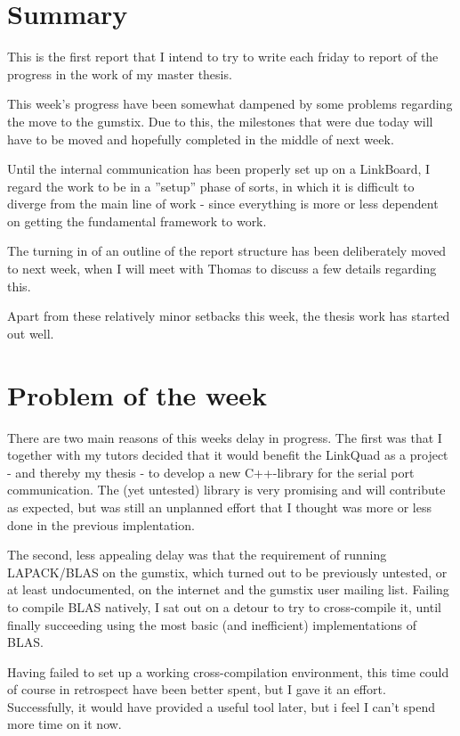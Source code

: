 \section{Summary}
This is the first report that I intend to try to write each friday to report
of the progress in the work of my master thesis.

This week's progress have been somewhat dampened by some problems regarding
the move to the gumstix. Due to this, the milestones that were due today
will have to be moved and hopefully completed in the middle of next week.

Until the internal communication has been properly set up on a LinkBoard,
I regard the work to be in a ''setup'' phase of sorts, in which it is
difficult to diverge from the main line of work - since everything is more
or less dependent on getting the fundamental framework to work.

The turning in of an outline of the report structure has been deliberately
moved to next week, when I will meet with Thomas to discuss a few details
regarding this.

Apart from these relatively minor setbacks this week, the thesis work
has started out well.

\section{Problem of the week}
There are two main reasons of this weeks delay in progress.
The first was that I together with my tutors decided that it would benefit
the LinkQuad as a project - and thereby my thesis - to develop a new C++-library for the
serial port communication. The (yet untested) library is very promising and
will contribute as expected, but was still an unplanned effort that I thought was
more or less done in the previous implentation.

The second, less appealing delay was that the requirement of running LAPACK/BLAS
on the gumstix, which turned out to be previously untested, or at least undocumented,
on the internet and the gumstix user mailing list. Failing to compile BLAS natively,
I sat out on a detour to try to cross-compile it, until finally succeeding using
the most basic (and inefficient) implementations of BLAS.

Having failed to set up a working cross-compilation environment, this
time could of course in retrospect have been better spent, but I gave it an
effort. Successfully, it would have provided a useful tool later, but
i feel I can't spend more time on it now.


